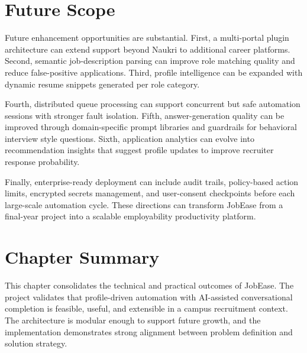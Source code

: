 \documentclass[12pt,a4paper,oneside]{report}
\begin{document}
\section{Future Scope}
Future enhancement opportunities are substantial. First, a multi-portal plugin architecture can extend support beyond Naukri to additional career platforms. Second, semantic job-description parsing can improve role matching quality and reduce false-positive applications. Third, profile intelligence can be expanded with dynamic resume snippets generated per role category.

Fourth, distributed queue processing can support concurrent but safe automation sessions with stronger fault isolation. Fifth, answer-generation quality can be improved through domain-specific prompt libraries and guardrails for behavioral interview style questions. Sixth, application analytics can evolve into recommendation insights that suggest profile updates to improve recruiter response probability.

Finally, enterprise-ready deployment can include audit trails, policy-based action limits, encrypted secrets management, and user-consent checkpoints before each large-scale automation cycle. These directions can transform JobEase from a final-year project into a scalable employability productivity platform.

\section{Chapter Summary}
This chapter consolidates the technical and practical outcomes of JobEase. The project validates that profile-driven automation with AI-assisted conversational completion is feasible, useful, and extensible in a campus recruitment context. The architecture is modular enough to support future growth, and the implementation demonstrates strong alignment between problem definition and solution strategy.
\end{document}
